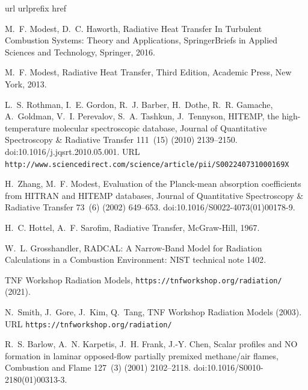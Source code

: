\documentclass[preprint,12pt]{elsarticle}
\begin{document}
    \begin{thebibliography}{10}
        \expandafter\ifx\csname url\endcsname\relax
        \def\url#1{\texttt{#1}}\fi
\expandafter\ifx\csname urlprefix\endcsname\relax\def\urlprefix{URL }\fi
\expandafter\ifx\csname href\endcsname\relax
\def\href#1#2{#2} \def\path#1{#1}\fi

M.~F. Modest, D.~C. Haworth, {Radiative Heat Transfer In Turbulent Combustion
Systems: Theory and Applications}, {SpringerBriefs in Applied Sciences and
Technology}, Springer, 2016.

M.~F. Modest, {Radiative Heat Transfer}, Third Edition, {Academic
Press}, New York, 2013.

L.~S. Rothman, I.~E. Gordon, R.~J. Barber, H.~Dothe, R.~R. Gamache, A.~Goldman,
V.~I. Perevalov, S.~A. Tashkun, J.~Tennyson,
\href{http://www.sciencedirect.com/science/article/pii/S002240731000169X}{{{HITEMP},
the high-temperature molecular spectroscopic database}}, {Journal of
Quantitative Spectroscopy {\&} Radiative Transfer} 111~(15) (2010)
2139--2150.
\newblock \href {http://dx.doi.org/10.1016/j.jqsrt.2010.05.001}
  {\path{doi:10.1016/j.jqsrt.2010.05.001}}.
\newline\urlprefix\url{http://www.sciencedirect.com/science/article/pii/S002240731000169X}

H.~Zhang, M.~F. Modest, {Evaluation of the Planck-mean absorption coefficients
from HITRAN and HITEMP databases}, {Journal of Quantitative Spectroscopy {\&}
Radiative Transfer} 73~(6) (2002) 649--653.
\newblock \href {http://dx.doi.org/10.1016/S0022-4073(01)00178-9}
  {\path{doi:10.1016/S0022-4073(01)00178-9}}.

H.~C. Hottel, A.~F. Sarofim, {Radiative Transfer}, McGraw-Hill, 1967.

W.~L. Grosshandler, {{RADCAL}: A Narrow-Band Model for Radiation Calculations
in a Combustion Environment: NIST technical note 1402}.

{TNF Workshop Radiation Models}, \url{https://tnfworkshop.org/radiation/}
(2021).

N.~Smith, J.~Gore, J.~Kim, Q.~Tang,
\href{https://tnfworkshop.org/radiation/}{{{TNF} Workshop Radiation Models}}
(2003).
\newline\urlprefix\url{https://tnfworkshop.org/radiation/}

R.~S. Barlow, A.~N. Karpetis, J.~H. Frank, J.-Y. Chen, {Scalar profiles and
{NO} formation in laminar opposed-flow partially premixed methane/air
flames}, {Combustion and Flame} 127~(3) (2001) 2102--2118.
\newblock \href {http://dx.doi.org/10.1016/S0010-2180(01)00313-3}
  {\path{doi:10.1016/S0010-2180(01)00313-3}}.


\end{thebibliography}
\end{document}
